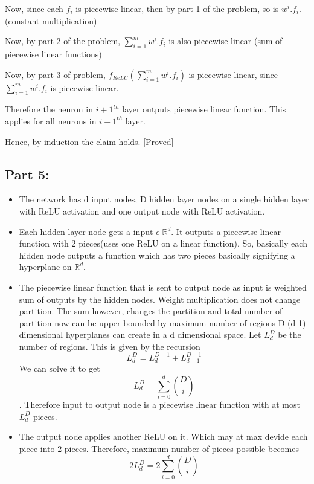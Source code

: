 \documentclass[a4paper,11pt]{article}
\begin{document}
\begin{mlsolution}
Now, since each $f_i$ is piecewise linear, then by part 1 of the problem, so is $w^i.f_i$.(constant multiplication)

Now, by part 2 of the problem,  $\sum_{i=1}^{m}w^i.f_i$ is also piecewise linear (sum of piecewise linear functions)

Now, by part 3 of problem, $f_{ReLU}(\sum_{i=1}^{m}w^i.f_i)$ is piecewise linear, since $\sum_{i=1}^{m}w^i.f_i$ is piecewise linear. 

Therefore the neuron in $i+1^{th}$ layer outputs piecewise linear function. This applies for all neurons in $i+1^{th}$ layer.

Hence, by induction the claim holds. [Proved]

\subsection*{Part 5:}
\begin{itemize}
\item The network has d input nodes, D hidden layer nodes on a single hidden layer with ReLU activation and one output node with ReLU activation.
\item Each  hidden layer node gets a input $\epsilon$ $\mathbb{R}^d$. It outputs a piecewise linear function  with 2 pieces(uses one ReLU on a linear function). So, basically each hidden node outputs a function which has two pieces basically signifying a hyperplane on $\mathbb{R}^d$.

\item The piecewise linear function that is sent to output node as input is weighted sum of outputs by the hidden nodes. Weight multiplication does not change partition. The sum however, changes the partition and total number of partition now can be upper bounded by maximum number of regions D (d-1) dimensional hyperplanes can create in a d dimensional space. Let $L^{D}_{d}$ be the number of regions. This is given by the recursion $$L^{D}_{d} = L^{D-1}_{d} + L^{D-1}_{d-1}$$ We can solve it to get $$L_{d}^{D} = \sum_{i=0}^{d}{D\choose i}$$.
Therefore input to output node is a piecewise linear function with at most $L_{d}^{D}$ pieces. 
\item The output node applies another ReLU on it. Which may at max devide each piece into 2 pieces. Therefore, maximum number of pieces possible becomes $$2L_{d}^{D} = 2\sum_{i=0}^{d}{D\choose i}$$
\end{itemize}
\end{mlsolution}
\end{document}
